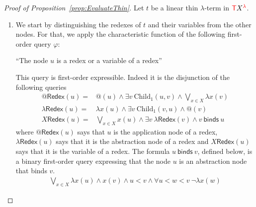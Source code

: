\begin{proof}[Proof of Proposition~\ref{prop:EvaluateThin}] Let $t$ be a linear thin $\lambda$-term in ${\color{red}{\mathsf T}} {X}^{{\color{red}{\lambda}}}$.




\begin{enumerate}
\item
We start by distinguishing the redexes of $t$ and their variables from the other nodes. For that, we apply the characteristic function of the following first-order query $\varphi$:
    \begin{center}
    ``The node $u$ is a redex or a variable of a redex''
    \end{center}
    This query is first-order expressible. Indeed it is the disjunction of the following queries
$$\begin{array}{rl}
@\mathsf{Redex}(u) = & @(u) \wedge \exists v \ \mathrm{Child}_1(u,v) \wedge \bigvee_{x\in X}\lambda x(v)\\[8pt]
\lambda\mathsf{Redex}(u)=& \lambda x(u) \wedge \exists v \ \mathrm{Child}_1(v,u) \wedge @(v) \\[8pt]
X\mathsf{Redex}(u) = &\bigvee_{x\in X} x(u) \wedge \exists v\ \lambda\mathsf{Redex}(v) \wedge v\ \mathsf{binds}\ u
\end{array}$$
where $@\mathsf{Redex}(u)$ says that $u$ is the application node of a redex, $\lambda\mathsf{Redex}(u)$ says that it is the abstraction node of a redex and $X\mathsf{Redex}(u)$ says that it is the variable of a redex. 
The formula $u\ \mathsf{binds}\ v$, defined below,  is a binary first-order query expressing that the node $u$ is an abstraction node that binds $v$.
 \begin{align*}
 \bigvee_{x\in X} \lambda x(u) \wedge x(v) \wedge u<v\wedge \forall u<w<v\ \neg \lambda x(w)
 \end{align*}


\end{enumerate}
\end{proof}

